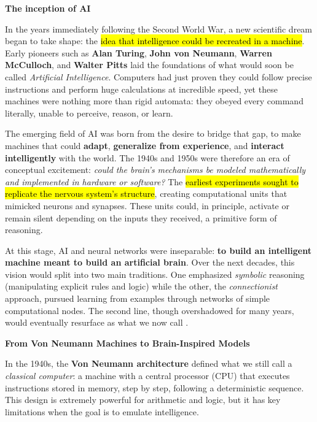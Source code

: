 \highspace
\begin{flushleft}
    \textcolor{Green3}{ \textbf{The inception of AI}}
\end{flushleft}
In the years immediately following the Second World War, a new scientific dream began to take shape: the \hl{idea that intelligence could be recreated in a machine}. Early pioneers such as \textbf{Alan Turing}, \textbf{John von Neumann}, \textbf{Warren McCulloch}, and \textbf{Walter Pitts} laid the foundations of what would soon be called \emph{Artificial Intelligence}. Computers had just proven they could follow precise instructions and perform huge calculations at incredible speed, yet these machines were nothing more than rigid automata: they obeyed every command literally, unable to perceive, reason, or learn.

\highspace
The emerging field of AI was born from the desire to bridge that gap, to make machines that could \textbf{adapt}, \textbf{generalize from experience}, and \textbf{interact intelligently} with the world. The 1940s and 1950s were therefore an era of conceptual excitement: \emph{could the brain's mechanisms be modeled mathematically and implemented in hardware or software?} The \hl{earliest experiments sought to replicate the nervous system's structure}, creating computational units that mimicked neurons and synapses. These units could, in principle, activate or remain silent depending on the inputs they received, a primitive form of reasoning.

\highspace
At this stage, AI and neural networks were inseparable: \textbf{to build an intelligent machine meant to build an artificial brain}. Over the next decades, this vision would split into two main traditions. One emphasized \emph{symbolic} reasoning (manipulating explicit rules and logic) while the other, the \emph{connectionist} approach, pursued learning from examples through networks of simple computational nodes. The second line, though overshadowed for many years, would eventually resurface as what we now call .

\highspace
\begin{flushleft}
    \textcolor{Green3}{ \textbf{From Von Neumann Machines to Brain-Inspired Models}}
\end{flushleft}
In the 1940s, the \textbf{Von Neumann architecture} defined what we still call a \emph{classical computer}: a machine with a central processor (CPU) that executes instructions stored in memory, step by step, following a deterministic sequence. This design is extremely powerful for arithmetic and logic, but it has key limitations when the goal is to emulate intelligence.

